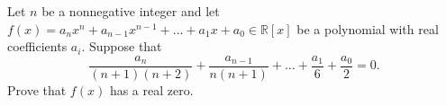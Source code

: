 Let $n$ be a nonnegative integer and let $f(x) = a_n x^n + a_{n-1} x^{n-1} +
\dots + a_1 x + a_0 \in \mathbb{R}[x]$ be a polynomial with real coefficients
$a_i$. Suppose that
$$ \frac{a_n}{(n+1)(n+2)} + \frac{a_{n-1}}{n(n+1)} + \dots + \frac{a_1}{6} + \frac{a_0}{2} = 0. $$
Prove that $f(x)$ has a real zero.
